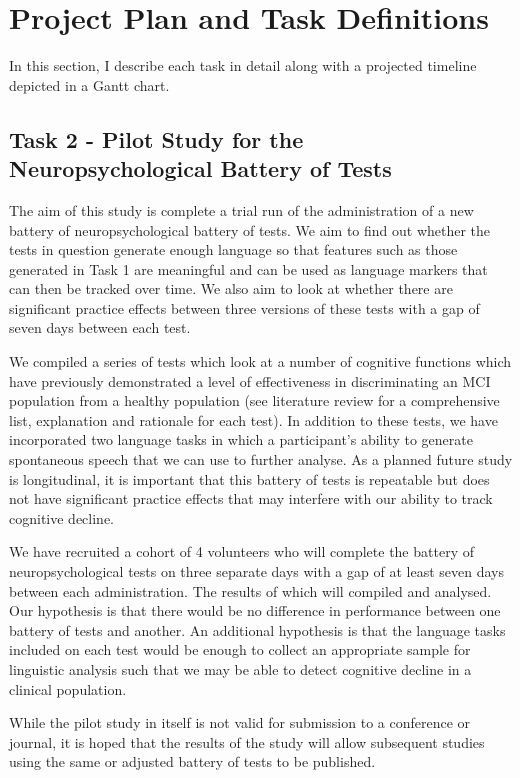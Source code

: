 \documentclass[10pt, letterpaper, twoside, openany]{book}
\begin{document}
\section{Project Plan and Task Definitions}
In this section, I describe each task in detail along with a projected timeline depicted in a Gantt chart.
\subsection{Task 2 - Pilot Study for the Neuropsychological Battery of Tests}
The aim of this study is complete a trial run of the administration of a new battery of neuropsychological battery of tests. We aim to find out whether the tests in question generate enough language so that features such as those generated in Task 1 are meaningful and can be used as language markers that can then be tracked over time. We also aim to look at whether there are significant practice effects between three versions of these tests with a gap of seven days between each test.
\par 
We compiled a series of tests which look at a number of cognitive functions which have previously demonstrated a level of effectiveness in discriminating an MCI population from a healthy population (see literature review for a comprehensive list, explanation and rationale for each test). In addition to these tests, we have incorporated two language tasks in which a participant's ability to generate spontaneous speech that we can use to further analyse. As a planned future study is longitudinal, it is important that this battery of tests is repeatable but does not have significant practice effects that may interfere with our ability to track cognitive decline.
\par 
We have recruited a cohort of 4 volunteers who will complete the battery of neuropsychological tests on three separate days with a gap of at least seven days between each administration. The results of which will compiled and analysed. Our hypothesis is that there would be no difference in performance between one battery of tests and another. An additional hypothesis is that the language tasks included on each test would be enough to collect an appropriate sample for linguistic analysis such that we may be able to detect cognitive decline in a clinical population.
\par 
While the pilot study in itself is not valid for submission to a conference or journal, it is hoped that the results of the study will allow subsequent studies using the same or adjusted battery of tests to be published.
\end{document}
